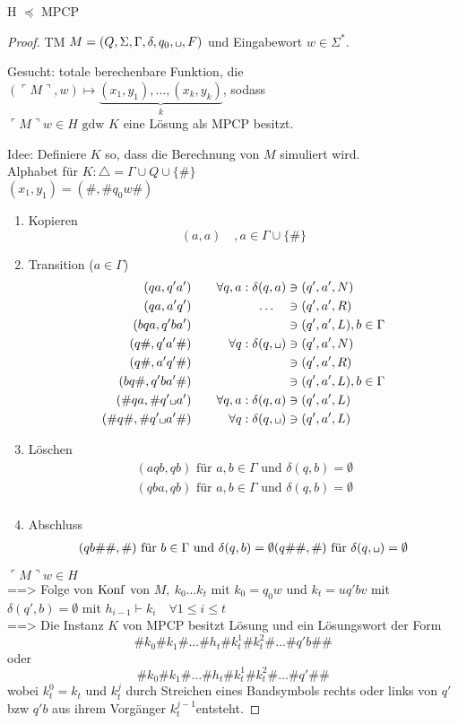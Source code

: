 \begin{lemma}[name={[H $\preceq$ \ac{MPCP}]}] 
	H $\preceq$ \ac{MPCP}
\end{lemma}
\begin{proof}
	\ac{TM} $M=(Q,\Sigma,\Gamma,\delta,q_0,\blank,F)$ und Eingabewort $w\in\Sigma^*$.
	
	Gesucht: totale berechenbare Funktion, die $(\ulcorner M \urcorner, w) \mapsto \underbrace{(x_1,y_1),\dots,(x_k,y_k)}_k$, sodass\\
	$\ulcorner M \urcorner w\in H \text{ gdw } K$ eine Lösung als \ac{MPCP} besitzt.
	
	Idee: Definiere $K$ so, dass die Berechnung von $M$ simuliert wird.\\
	Alphabet für $K: \triangle = \Gamma\cup Q\cup\{\#\}$\\
	$(x_1,y_1) = (\#,\#q_0w\#)$
	\begin{enumerate}
	\item Kopieren
		\[ (a,a)\quad, a\in\Gamma\cup\{\#\} \]
	\item Transition ($a \in \Gamma$)
		\begin{alignat*}{2}
			(qa,q'a') &\quad& \forall q,a:\delta(q,a) &\ni(q',a',N)\\
			(qa,a'q') && \dots\quad &\ni(q',a',R)\\
			(bqa,q'ba') &&  &\ni(q',a',L),b\in\Gamma\\
			(q\#,q'a'\#) && \forall q: \delta(q,\blank)&\ni(q',a',N)\\
			(q\#,a'q'\#) && &\ni(q',a',R)\\
			(bq\#,q'ba'\#) && &\ni(q',a',L),b\in\Gamma\\
			(\#qa,\#q'\blank a')&& \forall q,a:\delta(q,a) &\ni(q',a',L)\\
			(\#q\#,\#q'\blank a'\#)&& \forall q:\delta(q,\blank) &\ni(q',a',L)
		\end{alignat*}
	\item Löschen
		\begin{align*}
      &(aqb,qb) \text{ für $a,b\in \Gamma$  und $\delta(q,b) = \emptyset$ } \\
      &(qba,qb) \text{ für $a,b\in \Gamma$ und $\delta(q,b) = \emptyset$ } \\
		\end{align*}
	\item Abschluss
    \begin{align*}
      (qb\#\#,\#) \text{ für $b \in \Gamma$ und $\delta(q,b) = \emptyset$}
      (q\#\#,\#) \text{ für $\delta(q,\blank) = \emptyset$}
  \end{align*}
	\end{enumerate}
	$\ulcorner M \urcorner w\in H$\\
  \<==> Folge von $\operatorname{Konf}$ von $M,\ k_0\dots k_t$ mit $k_0 =q_0w$ und $k_t = uq'bv$ mit $\delta(q',b) = \emptyset$
	mit $h_{i-1}\vdash k_i\quad \forall 1\leq i\leq t$\\
	\<==> Die Instanz $K$ von \ac{MPCP} besitzt Lösung und ein Lösungswort der Form
	\[ \#k_0\#k_1\# \dots \#h_t\#k_t^1\#k_t^2\# \dots \#q'b\#\# \]
  oder 
	\[ \#k_0\#k_1\# \dots \#h_t\#k_t^1\#k_t^2\# \dots \#q'\#\# \]
	wobei $k_t^0 = k_t$ und $k_t^j$ durch Streichen eines Bandsymbols rechts oder links von $q'$ bzw $q'b$ aus ihrem Vorgänger $k_t^{j-1}$entsteht.


\end{proof}
